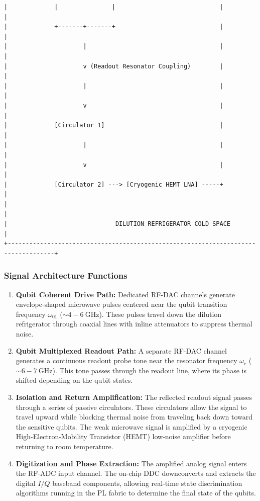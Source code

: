 \documentclass[
]{article}
\providecommand{\tightlist}{%
  \setlength{\itemsep}{0pt}\setlength{\parskip}{0pt}}
\begin{document}
\begin{verbatim}
|             |               |                             |                       |
|             +-------+-------+                             |                       |
|                     |                                     |                       |
|                     v (Readout Resonator Coupling)        |                       |
|                     |                                     |                       |
|                     v                                     |                       |
|             [Circulator 1]                                |                       |
|                     |                                     |                       |
|                     v                                     |                       |
|             [Circulator 2] ---> [Cryogenic HEMT LNA] -----+                       |
|                                                                                   |
|                              DILUTION REFRIGERATOR COLD SPACE                     |
+-----------------------------------------------------------------------------------+
\end{verbatim}

\subsubsection{Signal Architecture
Functions}\label{signal-architecture-functions}

\begin{enumerate}
\def\labelenumi{\arabic{enumi}.}
\tightlist
\item
  \textbf{Qubit Coherent Drive Path:} Dedicated RF-DAC channels generate
  envelope-shaped microwave pulses centered near the qubit transition
  frequency \(\omega_{01}\) (\(\sim 4 - 6\ \text{GHz}\)). These pulses
  travel down the dilution refrigerator through coaxial lines with
  inline attenuators to suppress thermal noise.
\item
  \textbf{Qubit Multiplexed Readout Path:} A separate RF-DAC channel
  generates a continuous readout probe tone near the resonator frequency
  \(\omega_r\) (\(\sim 6 - 7\ \text{GHz}\)). This tone passes through
  the readout line, where its phase is shifted depending on the qubit
  states.
\item
  \textbf{Isolation and Return Amplification:} The reflected readout
  signal passes through a series of passive circulators. These
  circulators allow the signal to travel upward while blocking thermal
  noise from traveling back down toward the sensitive qubits. The weak
  microwave signal is amplified by a cryogenic High-Electron-Mobility
  Transistor (HEMT) low-noise amplifier before returning to room
  temperature.
\item
  \textbf{Digitization and Phase Extraction:} The amplified analog
  signal enters the RF-ADC input channel. The on-chip DDC downconverts
  and extracts the digital \(I/Q\) baseband components, allowing
  real-time state discrimination algorithms running in the PL fabric to
  determine the final state of the qubits.
\end{enumerate}
\end{document}
